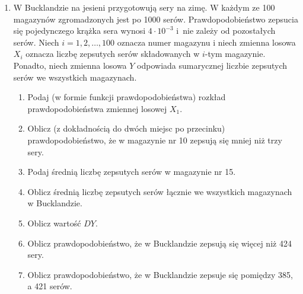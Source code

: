 \documentclass[twoside]{mwart}
\newcommand{\ans}[1]{}
\newenvironment{ansenv}{\comment}{\endcomment}
\newenvironment{ansenv}{\paragraph{Odpowiedź:}}{}
\newcommand{\ans}[1]{\begin{ansenv}#1\end{ansenv}}
\begin{document}
\begin{enumerate}
	\item W Bucklandzie na jesieni przygotowują sery na zimę. W każdym ze 100 magazynów
	zgromadzonych jest po 1000 serów. Prawdopodobieństwo zepsucia się pojedynczego
	krążka sera wynosi $4\cdot 10^{-3}$ i~nie zależy od pozostałych serów. Niech
	$i=1,2,\ldots,100$ oznacza numer magazynu i niech zmienna losowa $X_i$ oznacza
	liczbę zepsutych serów składowanych w $i$-tym magazynie. Ponadto, niech zmienna
	losowa $Y$ odpowiada sumarycznej liczbie zepsutych serów
	we wszystkich magazynach.
	
	\begin{enumerate}
		\item Podaj  (w formie funkcji prawdopodobieństwa) rozkład prawdopodobieństwa zmiennej losowej $X_1$.
		\item Oblicz (z dokładnością do dwóch miejsc po przecinku) prawdopodobieństwo, że w magazynie nr 10 zepsują się mniej niż trzy sery.
		\item Podaj średnią liczbę zepsutych serów w magazynie nr 15.
		\item Oblicz średnią liczbę zepsutych serów łącznie we wszystkich magazynach w Bucklandzie.
		\item Oblicz wartość $DY$.
		\item Oblicz prawdopodobieństwo, że w Bucklandzie zepsują się więcej niż 424 sery.
		\item Oblicz prawdopodobieństwo, że w Bucklandzie zepsuje się pomiędzy 385, a 421 serów.
	\end{enumerate}

	\ans{
		\begin{enumerate}
			\item \[ P(X_1=k) = {1000 \choose k} (4\cdot 10^{-3})^k(1-4\cdot 10^{-3})^{1000-k} \]
			\item Przybliżenie rozkładem Poissona $\lambda=1000\cdot4\cdot 10^{-3}=4$
			\[ P(X_{10}<3) = P(X_{10}\in\{0,1,2\}) = 0{,}0183+0{,}0733+0{,}1465=0{,}2381 \]
			\item $EX_{15}=1000\cdot4\cdot 10^{-3}=4$
			\item $Y$ jest sumą 100 zmiennych o rozkładzie $B(1000, 4\cdot 10^{-3})$, zatem samo ma rozkład dwumianowy: \mbox{$B(100\cdot 1000, 4\cdot 10^{-3})$}
			\[ EY=100000\cdot4=400 \]
			\item \[ DY = \sqrt{100000\cdot 4\cdot 10^{-3} \cdot (1-4\cdot 10^{-3})} \approx 20  \]
			\item Korzystamy z twierdzenia Moivre'a-Laplace'a i przybliżamy $Y$ rozkładem normalnym $N(400, 20^2 )$. $\Phi$ oznacza dystrybuantę $N(0,1)$
			\[ P(Y>424) = 1-F_{Y}(424) = \text{standaryzacja} = 1-\Phi(\frac{424-400}{20}) = 1-\Phi(1{,}2) = 1-0{,}885=0{,}115  \]
			\item Analogicznie; Z oznacza zmienną z $N(0,1)$
			\begin{align*}
			P(385\leq Y\leq 421) = P(\frac{385-400}{20} \leq Z \leq \frac{421-400}{20} ) = P(-0{,}75 \leq Z \leq 1{,}05) = \\ \Phi(1{,}05) - (1-\Phi(0{,}75)) = \Phi(1{,}05) + \Phi(0{,}75) - 1 = 0{,}8513 + 0{,}7734 - 1 = 0{,}625
			\end{align*}
		\end{enumerate}
	}


\end{enumerate}
\end{document}
